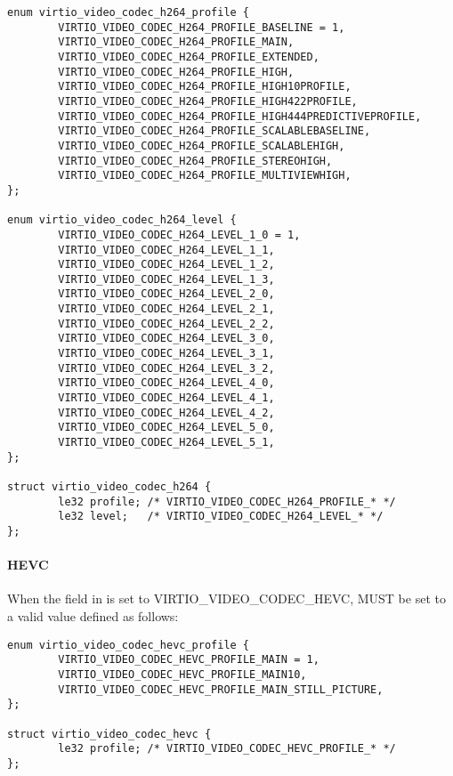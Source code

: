 \begin{lstlisting}
enum virtio_video_codec_h264_profile {
        VIRTIO_VIDEO_CODEC_H264_PROFILE_BASELINE = 1,
        VIRTIO_VIDEO_CODEC_H264_PROFILE_MAIN,
        VIRTIO_VIDEO_CODEC_H264_PROFILE_EXTENDED,
        VIRTIO_VIDEO_CODEC_H264_PROFILE_HIGH,
        VIRTIO_VIDEO_CODEC_H264_PROFILE_HIGH10PROFILE,
        VIRTIO_VIDEO_CODEC_H264_PROFILE_HIGH422PROFILE,
        VIRTIO_VIDEO_CODEC_H264_PROFILE_HIGH444PREDICTIVEPROFILE,
        VIRTIO_VIDEO_CODEC_H264_PROFILE_SCALABLEBASELINE,
        VIRTIO_VIDEO_CODEC_H264_PROFILE_SCALABLEHIGH,
        VIRTIO_VIDEO_CODEC_H264_PROFILE_STEREOHIGH,
        VIRTIO_VIDEO_CODEC_H264_PROFILE_MULTIVIEWHIGH,
};

enum virtio_video_codec_h264_level {
        VIRTIO_VIDEO_CODEC_H264_LEVEL_1_0 = 1,
        VIRTIO_VIDEO_CODEC_H264_LEVEL_1_1,
        VIRTIO_VIDEO_CODEC_H264_LEVEL_1_2,
        VIRTIO_VIDEO_CODEC_H264_LEVEL_1_3,
        VIRTIO_VIDEO_CODEC_H264_LEVEL_2_0,
        VIRTIO_VIDEO_CODEC_H264_LEVEL_2_1,
        VIRTIO_VIDEO_CODEC_H264_LEVEL_2_2,
        VIRTIO_VIDEO_CODEC_H264_LEVEL_3_0,
        VIRTIO_VIDEO_CODEC_H264_LEVEL_3_1,
        VIRTIO_VIDEO_CODEC_H264_LEVEL_3_2,
        VIRTIO_VIDEO_CODEC_H264_LEVEL_4_0,
        VIRTIO_VIDEO_CODEC_H264_LEVEL_4_1,
        VIRTIO_VIDEO_CODEC_H264_LEVEL_4_2,
        VIRTIO_VIDEO_CODEC_H264_LEVEL_5_0,
        VIRTIO_VIDEO_CODEC_H264_LEVEL_5_1,
};

struct virtio_video_codec_h264 {
        le32 profile; /* VIRTIO_VIDEO_CODEC_H264_PROFILE_* */
        le32 level;   /* VIRTIO_VIDEO_CODEC_H264_LEVEL_* */
};
\end{lstlisting}

\paragraph{HEVC}

When the field  in 
is set to VIRTIO_VIDEO_CODEC_HEVC,  MUST be set to a
valid value defined as follows:

\begin{lstlisting}
enum virtio_video_codec_hevc_profile {
        VIRTIO_VIDEO_CODEC_HEVC_PROFILE_MAIN = 1,
        VIRTIO_VIDEO_CODEC_HEVC_PROFILE_MAIN10,
        VIRTIO_VIDEO_CODEC_HEVC_PROFILE_MAIN_STILL_PICTURE,
};

struct virtio_video_codec_hevc {
        le32 profile; /* VIRTIO_VIDEO_CODEC_HEVC_PROFILE_* */
};
\end{lstlisting}

